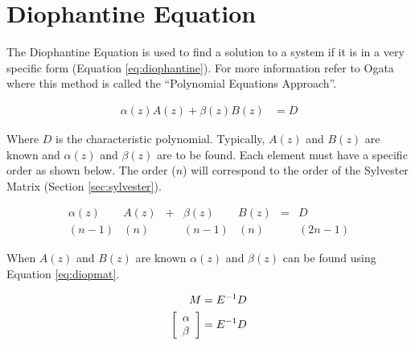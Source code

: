 \documentclass{article}
\newcommand{\sincludepdf}[2][]{
	
}
\begin{document}
\sincludepdf[pages={12},
			pagecommand=\subsection*{Example 2}
		]{scan/11211301.pdf}

\sincludepdf[pages={13},
			pagecommand=\subsection*{Example 3}
		]{scan/11211301.pdf}

\section{Diophantine Equation}

The Diophantine Equation is used to find a solution to a system
if it is in a very specific form (Equation \ref{eq:diophantine}).
For more information refer to Ogata\autocite[Pg. 525]{ogata1995discrete}
where this method is called the ``Polynomial Equations Approach''.

\begin{align}
	\alpha(z)A(z) + \beta(z)B(z) &= D \label{eq:diophantine}
\end{align}

Where $D$ is the characteristic polynomial.
Typically, $A(z)$ and $B(z)$ are known and $\alpha(z)$ and $\beta(z)$
are to be found.
Each element must have a specific order as shown below.
The order ($n$) will correspond to the order of the
Sylvester Matrix (Section \ref{sec:sylvester}).

\[
\begin{array}{ccccccc}
	\alpha(z) &A(z) &+ &\beta(z) &B(z) &= &D \\
	  (n-1)   &(n)  &  & (n-1)  &(n) & &(2n-1)
\end{array}
\]

When $A(z)$ and $B(z)$ are known $\alpha(z)$ and $\beta(z)$
can be found using Equation \ref{eq:diopmat}.

\begin{align}
	M &= E^{-1} D \label{eq:diopmat} \\
	\left[
	\begin{array}{l}
		\alpha \\
		\beta
	\end{array}
	\right] &= E^{-1} D \notag
\end{align}
\end{document}
